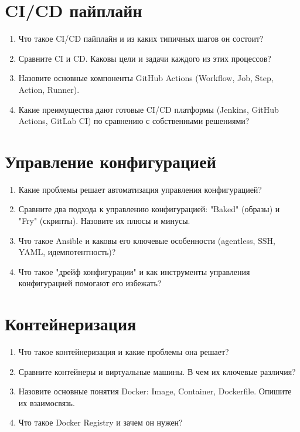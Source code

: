 \documentclass[12pt,a4paper]{article}
\begin{document}
\section{CI/CD пайплайн}
\begin{enumerate}
    \item Что такое CI/CD пайплайн и из каких типичных шагов он состоит?
    \item Сравните CI и CD. Каковы цели и задачи каждого из этих процессов?
    \item Назовите основные компоненты GitHub Actions (Workflow, Job, Step, Action, Runner).
    \item Какие преимущества дают готовые CI/CD платформы (Jenkins, GitHub Actions, GitLab CI) по сравнению с собственными решениями?
\end{enumerate}

\section{Управление конфигурацией}
\begin{enumerate}
    \item Какие проблемы решает автоматизация управления конфигурацией?
    \item Сравните два подхода к управлению конфигурацией: "Baked" (образы) и "Fry" (скрипты). Назовите их плюсы и минусы.
    \item Что такое Ansible и каковы его ключевые особенности (agentless, SSH, YAML, идемпотентность)?
    \item Что такое "дрейф конфигурации" и как инструменты управления конфигурацией помогают его избежать?
\end{enumerate}

\section{Контейнеризация}
\begin{enumerate}
    \item Что такое контейнеризация и какие проблемы она решает?
    \item Сравните контейнеры и виртуальные машины. В чем их ключевые различия?
    \item Назовите основные понятия Docker: Image, Container, Dockerfile. Опишите их взаимосвязь.
    \item Что такое Docker Registry и зачем он нужен?
\end{enumerate}
\end{document}
